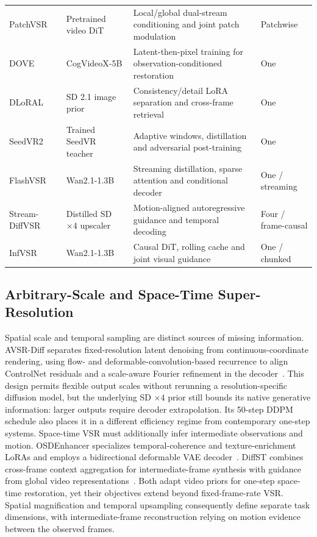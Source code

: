\begin{table}[t]
\begin{tabularx}{\textwidth}{@{}p{}p{}Yp{0.12\textwidth}@{}}
PatchVSR~\cite{patch} & Pretrained video DiT & Local/global dual-stream conditioning and joint patch modulation & Patchwise \\
DOVE~\cite{dove} & CogVideoX-5B & Latent-then-pixel training for observation-conditioned restoration & One \\
DLoRAL~\cite{dloral} & SD 2.1 image prior & Consistency/detail LoRA separation and cross-frame retrieval & One \\
SeedVR2~\cite{seedvr2} & Trained SeedVR teacher & Adaptive windows, distillation and adversarial post-training & One \\
FlashVSR~\cite{flash} & Wan2.1-1.3B & Streaming distillation, sparse attention and conditional decoder & One / streaming \\
Stream-DiffVSR~\cite{stream} & Distilled SD $\times4$ upscaler & Motion-aligned autoregressive guidance and temporal decoding & Four / frame-causal \\
InfVSR~\cite{infvsr} & Wan2.1-1.3B & Causal DiT, rolling cache and joint visual guidance & One / chunked \\\bottomrule
\end{tabularx}
\end{table}

\subsection{Arbitrary-Scale and Space-Time Super-Resolution}
Spatial scale and temporal sampling are distinct sources of missing information. AVSR-Diff separates fixed-resolution latent denoising from continuous-coordinate rendering, using flow- and deformable-convolution-based recurrence to align ControlNet residuals and a scale-aware Fourier refinement in the decoder~\cite{avsrdiff}. This design permits flexible output scales without rerunning a resolution-specific diffusion model, but the underlying SD $\times4$ prior still bounds its native generative information: larger outputs require decoder extrapolation. Its 50-step DDPM schedule also places it in a different efficiency regime from contemporary one-step systems. Space-time VSR must additionally infer intermediate observations and motion. OSDEnhancer specializes temporal-coherence and texture-enrichment LoRAs and employs a bidirectional deformable VAE decoder~\cite{osdenhancer}. DiffST combines cross-frame context aggregation for intermediate-frame synthesis with guidance from global video representations~\cite{diffst}. Both adapt video priors for one-step space-time restoration, yet their objectives extend beyond fixed-frame-rate VSR. Spatial magnification and temporal upsampling consequently define separate task dimensions, with intermediate-frame reconstruction relying on motion evidence between the observed frames.

